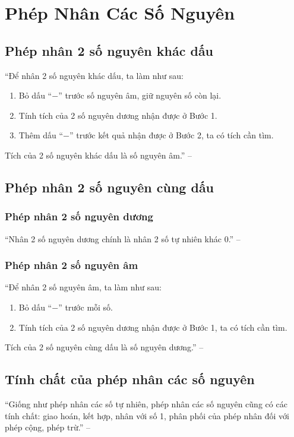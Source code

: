 \documentclass[oneside]{book}
\numberwithin{equation}{section}
\begin{document}

\section{Phép Nhân Các Số Nguyên}

\subsection{Phép nhân 2 số nguyên khác dấu}
``Để nhân 2 số nguyên khác dấu, ta làm như sau:
\begin{enumerate}
	\item Bỏ dấu ``$-$'' trước số nguyên âm, giữ nguyên số còn lại.
	\item Tính tích của 2 số nguyên dương nhận được ở Bước 1.
	\item Thêm dấu ``$-$'' trước kết quả nhận được ở Bước 2, ta có tích cần tìm.
\end{enumerate}
Tích của 2 số nguyên khác dấu là số nguyên âm.'' -- \cite[p. 80]{Thai_Anh_Dat_Ha_Loan_Nam_Quang_Toan_6_tap_1}

\subsection{Phép nhân 2 số nguyên cùng dấu}

\subsubsection{Phép nhân 2 số nguyên dương}
``Nhân 2 số nguyên dương chính là nhân 2 số tự nhiên khác 0.'' -- \cite[p. 81]{Thai_Anh_Dat_Ha_Loan_Nam_Quang_Toan_6_tap_1}

\subsubsection{Phép nhân 2 số nguyên âm}
``Để nhân 2 số nguyên âm, ta làm như sau:
\begin{enumerate}
	\item Bỏ dấu ``$-$'' trước mỗi số.
	\item Tính tích của 2 số nguyên dương nhận được ở Bước 1, ta có tích cần tìm.
\end{enumerate}
Tích của 2 số nguyên cùng dấu là số nguyên dương.'' -- \cite[p. 81]{Thai_Anh_Dat_Ha_Loan_Nam_Quang_Toan_6_tap_1}

\subsection{Tính chất của phép nhân các số nguyên}
``Giống như phép nhân các số tự nhiên, phép nhân các số nguyên cũng có các tính chất: giao hoán, kết hợp, nhân với số 1, phân phối của phép nhân đối với phép cộng, phép trừ.'' -- \cite[p. 82]{Thai_Anh_Dat_Ha_Loan_Nam_Quang_Toan_6_tap_1}
\end{document}
